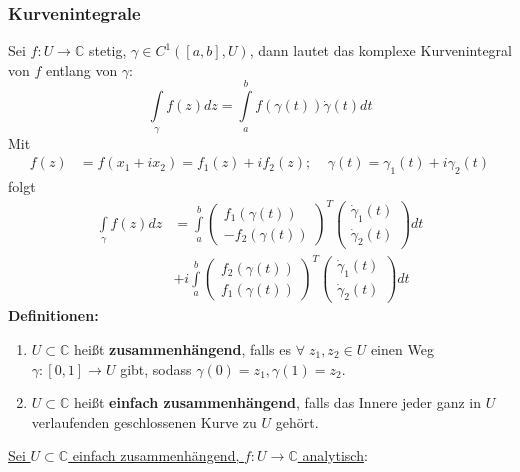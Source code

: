 \documentclass[a4paper,twocolumn,10pt]{article}
\begin{document}
\subsubsection{Kurvenintegrale}
Sei $f:U\rightarrow\mathbb{C}$ stetig, $\gamma\in C^1([a,b],U)$, dann lautet das komplexe Kurvenintegral von $f$ entlang von $\gamma$:
\begin{equation*}
\int\limits_{\gamma}f(z)dz=\int\limits_a^bf(\gamma(t))\dot{\gamma}(t)dt
\end{equation*}
Mit
\begin{equation*}
\begin{split}
f(z)&=f(x_1+ix_2)=f_1(z)+if_2(z);\;\;\;\;\gamma(t)=\gamma_1(t)+i\gamma_2(t)
\end{split}
\end{equation*}
folgt
\begin{equation*}
\begin{split}
\int\limits_{\gamma}f(z)dz&=\int\limits_a^b\begin{pmatrix}f_1(\gamma(t)) \\ -f_2(\gamma(t))\end{pmatrix}^T \begin{pmatrix}\dot{\gamma}_1(t) \\ \dot{\gamma}_2(t)\end{pmatrix} dt\\
&+i\int\limits_a^b\begin{pmatrix}f_2(\gamma(t)) \\ f_1(\gamma(t))\end{pmatrix}^T \begin{pmatrix}\dot{\gamma}_1(t) \\ \dot{\gamma}_2(t)\end{pmatrix}dt
\end{split}
\end{equation*}
\textbf{Definitionen:}
\begin{enumerate}[label=$\bullet$]
\item $U\subset\mathbb{C}$ heißt \textbf{zusammenhängend}, falls es $\forall\;z_1,z_2\in U$ einen Weg $\gamma:[0,1]\rightarrow U$ gibt, sodass $\gamma(0)=z_1,\gamma(1)=z_2$.
\item $U\subset\mathbb{C}$ heißt \textbf{einfach zusammenhängend}, falls das Innere jeder ganz in $U$ verlaufenden geschlossenen Kurve zu $U$ gehört.
\end{enumerate}
\underline{Sei $U\subset\mathbb{C}$ einfach zusammenhängend, $f:U\rightarrow\mathbb{C}$ analytisch}:
\end{document}
